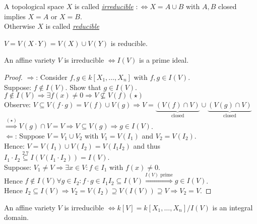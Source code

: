 \begin{defi}
A topological space $X$ is called \emph{\underline{irreducible}} $:\iff X=A\cup B$ with $A,B$ closed implies $X=A$ or $X=B$.\\
Otherwise $X$ is called \emph{\underline{reducible}}
\end{defi}

\begin{Bsp}
$V=V(X\cdot Y)=V(X) \cup V(Y)$ is reducible. 
\end{Bsp}

\begin{Prop}
An affine variety $V$ is irreducible $\iff I(V)$ is a prime ideal.
\end{Prop}

\begin{proof}
\glqq $\Rightarrow$\grqq: Consider $f,g \in k[X_1, \dots, X_n]$ with $f,g \in I(V)$.\\
Suppose: $f \not \in I(V)$. Show that $g \in I(V)$.\\
$f \not \in I(V) \Rightarrow \exists f(x) \neq 0 \Rightarrow V \not\subseteq V(f) (\star)$\\
Observe: $V \subseteq V(f\cdot g) =V(f) \cup V(g) \Rightarrow V=\underbrace{(V(f) \cap V)}_{\text{closed}} \cup \underbrace{(V(g) \cap V)}_{\text{closed}}$\\
$\stackrel{(\star)}{\Rightarrow} V(g) \cap V =V \Rightarrow V \subseteq V(g) \Rightarrow g \in I(V)$.\\
\glqq $\Leftarrow$\grqq: Suppose $V=V_1 \cup V_2$ with $V_1 =V(I_1)$ and $V_2=V(I_2)$.\\
Hence: $V=V(I_1) \cup V(I_2)=V(I_1 I_2)$ and thus $I_1 \cdot I_2 \stackrel{2.7}{\subseteq} I(V(I_1 \cdot I_2)) = I(V)$.\\
Suppose: $V_1 \neq V \Rightarrow \exists x \in V: f \in I_1$ with $f(x)\neq 0$.\\
Hence $f \not \in I(V) \forall g \in I_2: f\cdot g \in I_1 I_2 \subseteq I(V) \stackrel{I(V) \text{ prime}}{\Longrightarrow} g \in I(V)$.\\
Hence $I_2 \subseteq I(V) \Rightarrow V_2=V(I_2)\supseteq V(I(V)) \supseteq V \Rightarrow V_2=V$.
\end{proof}

\begin{Bem}
An affine variety $V$ is irreducible $\iff k[V]=k[X_1, \dots, X_n]/I(V)$ is an integral domain.
\end{Bem}

